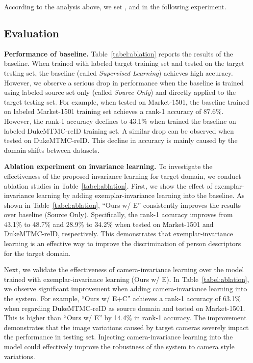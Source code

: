 \documentclass[10pt,twocolumn,letterpaper]{article}
\begin{document}
According to the analysis above, we set ,  and  in the following experiment.



\subsection{Evaluation}

\textbf{Performance of baseline.} Table~\ref{tabel:ablation} reports the results of the baseline. When trained with labeled target training set and tested on the target testing set, the baseline (called \emph{Supervised Learning}) achieves high accuracy. However, we observe a serious drop in performance when the baseline is trained using labeled source set only (called \emph{Source Only}) and directly applied to the target testing set. For example, when tested on Market-1501, the baseline trained on labeled Market-1501 training set achieves a rank-1 accuracy of 87.6\%. However, the rank-1 accuracy declines to 43.1\% when trained the baseline on labeled DukeMTMC-reID training set. A similar drop can be observed when tested on DukeMTMC-reID. This decline in accuracy is mainly caused by the domain shifts between datasets.


\textbf{Ablation experiment on invariance learning.} To investigate the effectiveness of the proposed invariance learning for target domain, we conduct ablation studies in Table~\ref{tabel:ablation}. First, we show the effect of exemplar-invariance learning by adding exemplar-invariance learning into the baseline. As shown in Table~\ref{tabel:ablation}, ``Ours w/ E'' consistently improves the results over baseline (Source Only). Specifically, the rank-1 accuracy improves from 43.1\% to 48.7\% and 28.9\% to 34.2\% when tested on Market-1501 and DukeMTMC-reID, respectively. This demonstrates that exemplar-invariance learning is an effective way to improve the discrimination of person descriptors for the target domain.


Next, we validate the effectiveness of camera-invariance learning over the model trained with exemplar-invariance learning (Ours w/ E). In Table~\ref{tabel:ablation}, we observe significant improvement when adding camera-invariance learning into the system. For example, ``Ours w/ E+C'' achieves a rank-1 accuracy of 63.1\% when regarding DukeMTMC-reID as source domain and tested on Market-1501. This is higher than ``Ours w/ E'' by 14.4\% in rank-1 accuracy. The improvement demonstrates that the image variations caused by target cameras severely impact the performance in testing set. Injecting camera-invariance learning into the model could effectively improve the robustness of the system to camera style variations.
\end{document}
